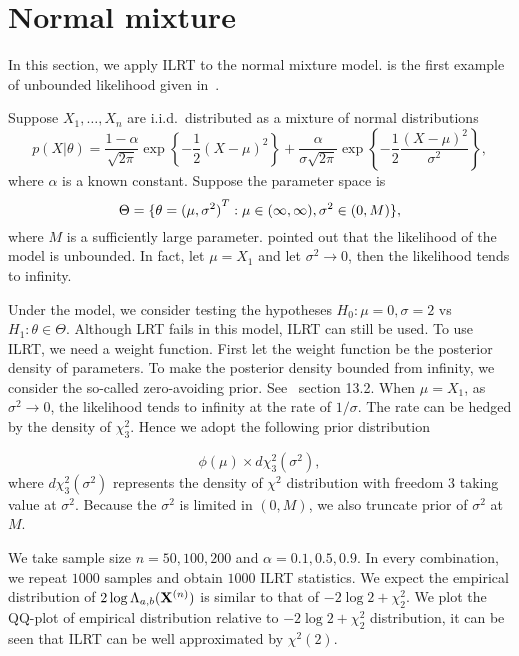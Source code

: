 
\section{Normal mixture}

 In this section, we apply ILRT to the normal mixture model.
 is the first example of unbounded likelihood given in~\cite{Cam1990Maximum}.


Suppose $X_1,\ldots,X_n$ are i.i.d.\ distributed as a mixture of normal distributions
\begin{equation}
    p(X|\theta)=\frac{1-\alpha}{\sqrt{2\pi}}\exp\left\{-\frac{1}{2}{(X-\mu)}^2\right\}+
    \frac{\alpha}{\sigma\sqrt{2\pi}}\exp\left\{-\frac{1}{2}\frac{{(X-\mu)}^2}{\sigma^2}\right\},
\end{equation}
 where $\alpha$ is a known constant. Suppose the parameter space is
\begin{equation}
    \Theta=\{\theta={(\mu,\sigma^2)}^T:\mu\in(\-\infty,\infty),\sigma^2\in (0,M)\},
\end{equation}
where $M$ is a sufficiently large parameter.
\cite{Cam1990Maximum} pointed out that the likelihood of the model is unbounded. In fact, let $\mu=X_1$ and let $\sigma^2\to 0$, then the likelihood tends to infinity.

Under the model, we consider testing the hypotheses $H_0:\mu=0,\sigma=2$ vs $H_1:\theta\in
\Theta$. Although LRT fails in this model, ILRT can still be used. To use ILRT, we need a weight function.
First let the weight function be the posterior density of parameters. To make the posterior density bounded from infinity, we consider the so-called zero-avoiding prior. See~\cite{bayesianDataAnalysis} section 13.2.
When $\mu=X_1$, as $\sigma^2\to 0$, the likelihood tends to infinity at the rate of ${1}/{\sigma}$. The rate can be hedged by the density of $\chi^2_3$. Hence we adopt the following prior distribution

\begin{equation}
    \phi(\mu)\times d\chi^2_3(\sigma^2),
\end{equation}
where $d\chi^2_3(\sigma^2)$ represents the density of $\chi^2$ distribution with freedom $3$ taking value at $\sigma^2$. Because the $\sigma^2$ is limited in $(0,M)$, we also truncate prior of $\sigma^2$ at $M$.

 We take sample size $n=50,100,200$ and $\alpha=0.1,0.5,0.9$. In every combination, we repeat $1000$ samples and obtain $1000$ ILRT statistics.
 We expect the empirical distribution of $2\log \Lambda_{a,b}(\mathbf{X}^{(n)})$ is similar to that of $-2\log 2+\chi^2_2$.
 We plot the QQ-plot of empirical distribution relative to  $-2\log 2+\chi^2_2$ distribution, it can be seen that ILRT can be well approximated by $\chi^2(2)$.


